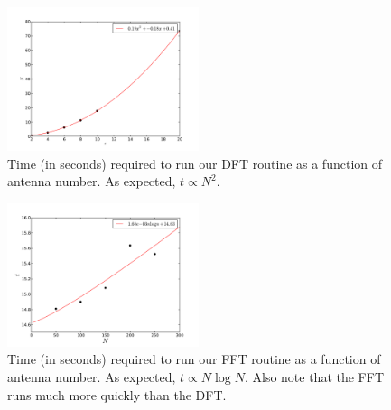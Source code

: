 \documentclass[11pt,letterpaper]{article}
\begin{document}
\begin{figure}[!h]
\centering
\includegraphics[width=0.5\textwidth]{DFT_image_timing.pdf}
\caption{Time (in seconds) required to run our DFT routine as a function of 
antenna number.  As expected, $t\propto N^2$.}
\label{fig:DFTtime}
\end{figure}

\begin{figure}[!h]
\centering
\includegraphics[width=0.5\textwidth]{FFT_image_timing.pdf}
\caption{Time (in seconds) required to run our FFT routine as a function of 
antenna number.  As expected, $t\propto N\log N$.  Also note that the FFT 
runs much more quickly than the DFT.}
\label{fig:FFTtime}
\end{figure}
\end{document}

